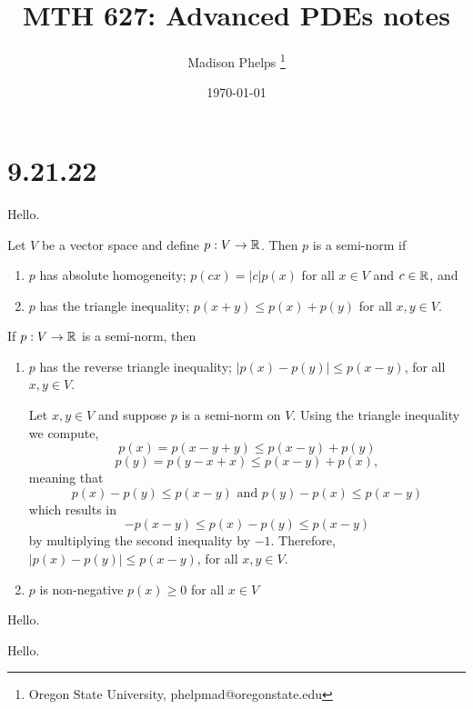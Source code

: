 \documentclass{article}
\title{MTH 627: Advanced PDEs notes}
\author{Madison Phelps \thanks{Oregon State University, phelpmad@oregonstate.edu}}
\date{\today}
\begin{document}
\maketitle

\thispagestyle{empty}

\break

\tableofcontents

\thispagestyle{empty}

\break

\section{9.21.22}

Hello.

\begin{definition} Let $V$ be a vector space and define $p:V\to \mathbb R$. Then $p$ is a semi-norm if
	\begin{enumerate}
		\item $p$ has absolute homogeneity; $p(cx) = |c| p(x)$ for all $x\in V$ and $c\in\mathbb R$, and
		\item $p$ has the triangle inequality; $p(x+y) \leq p(x) + p(y)$ for all $x,y\in V$.
	\end{enumerate}
\end{definition}



\begin{property} If $p: V\to \mathbb R$ is a semi-norm, then
	\begin{enumerate}
		\item $p$ has the reverse triangle inequality; $|p(x)-p(y)|\leq p(x-y)$, for all $x,y\in V$. 
		
			\begin{solution}{
				Let $x,y\in V$ and suppose $p$ is a semi-norm on $V$. Using the triangle inequality we compute,
					\[p(x) = p(x-y+y) \leq p(x-y)+p(y)\]
					\[p(y) = p(y-x+x) \leq p(x-y) + p(x),\]
				meaning that
					\[p(x) - p(y) \leq p(x-y) \text{ and } p(y)-p(x) \leq p(x-y)\]
				which results in 
					\[-p(x-y) \leq p(x)-p(y) \leq p(x-y)\]
				by multiplying the second inequality by $-1$. Therefore,  $|p(x)-p(y)|\leq p(x-y)$, for all $x,y\in V$.
			}\end{solution}	
				
		\item $p$ is non-negative $p(x) \geq 0$ for all $x\in V$
	\end{enumerate}
	
	Hello.
\end{property}

Hello.
\end{document}
